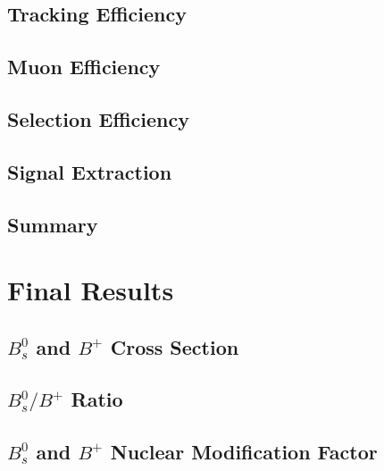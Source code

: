 \subsection{Tracking Efficiency}

\subsection{Muon Efficiency}

\subsection{Selection Efficiency}

\subsection{Signal Extraction}

\subsection{Summary}

\section{Final Results} 

\subsection{$B^0_s$ and $B^{+}$ Cross Section}

\subsection{$B^0_s/B^{+}$ Ratio}

\subsection{$B^0_s$ and $B^{+}$ Nuclear Modification Factor}

